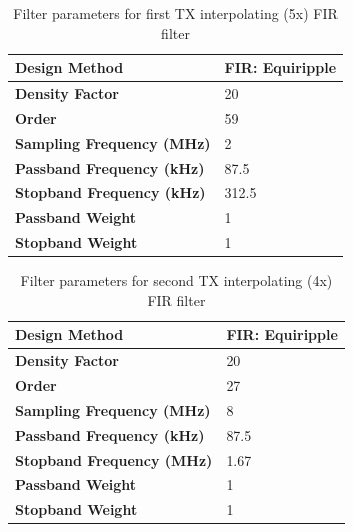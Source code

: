 \begin{table}[h]
  \centering
  \caption{Filter parameters for first TX interpolating (5x) FIR filter}
  \label{tab:tx_interp_fir1}
  \footnotesize
  \begin{tabular} {|l|l|}
    \hline
    \textbf{Design Method}              & FIR: Equiripple \\ \hline
    \textbf{Density Factor}             & 20              \\ \hline
    \textbf{Order}                      & 59              \\ \hline
    \textbf{Sampling Frequency (MHz)}   & 2               \\ \hline
    \textbf{Passband Frequency (kHz)}   & 87.5            \\ \hline
    \textbf{Stopband Frequency (kHz)}   & 312.5           \\ \hline
    \textbf{Passband Weight}            & 1               \\ \hline
    \textbf{Stopband Weight}            & 1               \\ \hline
  \end{tabular}
\end{table}

\begin{table}[h]
  \centering
  \caption{Filter parameters for second TX interpolating (4x) FIR filter}
  \label{tab:tx_interp_fir2}
  \footnotesize
  \begin{tabular} {|l|l|}
    \hline
    \textbf{Design Method}              & FIR: Equiripple \\ \hline
    \textbf{Density Factor}             & 20              \\ \hline
    \textbf{Order}                      & 27              \\ \hline
    \textbf{Sampling Frequency (MHz)}   & 8               \\ \hline
    \textbf{Passband Frequency (kHz)}   & 87.5            \\ \hline
    \textbf{Stopband Frequency (MHz)}   & 1.67            \\ \hline
    \textbf{Passband Weight}            & 1               \\ \hline
    \textbf{Stopband Weight}            & 1               \\ \hline
  \end{tabular}
\end{table}

